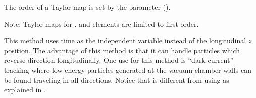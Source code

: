 \begin{description}
The order of a Taylor map is set by the 
parameter ().

Note: Taylor maps for , and
 elements are limited to first order.

\item[\vn{Time_Runge_Kutta}]
This method uses time as the independent variable instead of
the longitudinal $z$ position. The advantage of this method is that it can
handle particles which reverse direction longitudinally.  One use for
this method is ``dark current'' tracking where low energy particles
generated at the vacuum chamber walls can be found traveling in all
directions. Notice that  is different from using
 as explained in .

\end{description}


